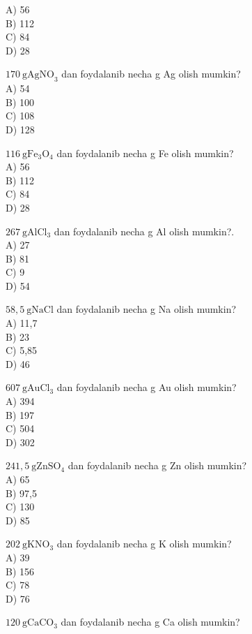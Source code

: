 A) 56\\
B) 112\\
C) 84\\
D) 28\\
  \item $170 \mathrm{~g} \mathrm{AgNO}_{3}$ dan foydalanib necha g Ag olish mumkin?\\
A) 54\\
B) 100\\
C) 108\\
D) 128
  \item $116 \mathrm{~g} \mathrm{Fe}_{3} \mathrm{O}_{4}$ dan foydalanib necha g Fe olish mumkin?\\
A) 56\\
B) 112\\
C) 84\\
D) 28
  \item $267 \mathrm{~g} \mathrm{AlCl}_{3}$ dan foydalanib necha g Al olish mumkin?.\\
A) 27\\
B) 81\\
C) 9\\
D) 54
  \item $58,5 \mathrm{~g} \mathrm{NaCl}$ dan foydalanib necha g Na olish mumkin?\\
A) 11,7\\
B) 23\\
C) 5,85\\
D) 46
  \item $607 \mathrm{~g} \mathrm{AuCl}_{3}$ dan foydalanib necha g Au olish mumkin?\\
A) 394\\
B) 197\\
C) 504\\
D) 302
  \item $241,5 \mathrm{~g} \mathrm{ZnSO}{ }_{4}$ dan foydalanib necha g Zn olish mumkin?\\
A) 65\\
B) 97,5\\
C) 130\\
D) 85
  \item $202 \mathrm{~g} \mathrm{KNO}_{3}$ dan foydalanib necha g K olish mumkin?\\
A) 39\\
B) 156\\
C) 78\\
D) 76
  \item $120 \mathrm{~g} \mathrm{CaCO}_{3}$ dan foydalanib necha g Ca olish mumkin?\\
